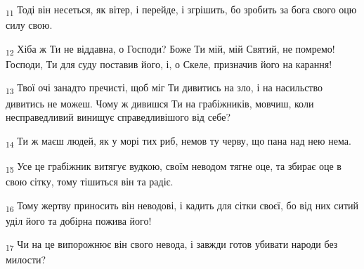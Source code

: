 \begin{tcolorbox}
\textsubscript{11} Тоді він несеться, як вітер, і перейде, і згрішить, бо зробить за бога свого оцю силу свою.
\end{tcolorbox}
\begin{tcolorbox}
\textsubscript{12} Хіба ж Ти не віддавна, о Господи? Боже Ти мій, мій Святий, не помремо! Господи, Ти для суду поставив його, і, о Скеле, призначив його на карання!
\end{tcolorbox}
\begin{tcolorbox}
\textsubscript{13} Твої очі занадто пречисті, щоб міг Ти дивитись на зло, і на насильство дивитись не можеш. Чому ж дивишся Ти на грабіжників, мовчиш, коли несправедливий винищує справедливішого від себе?
\end{tcolorbox}
\begin{tcolorbox}
\textsubscript{14} Ти ж маєш людей, як у морі тих риб, немов ту черву, що пана над нею нема.
\end{tcolorbox}
\begin{tcolorbox}
\textsubscript{15} Усе це грабіжник витягує вудкою, своїм неводом тягне оце, та збирає оце в свою сітку, тому тішиться він та радіє.
\end{tcolorbox}
\begin{tcolorbox}
\textsubscript{16} Тому жертву приносить він неводові, і кадить для сітки своєї, бо від них ситий уділ його та добірна пожива його!
\end{tcolorbox}
\begin{tcolorbox}
\textsubscript{17} Чи на це випорожнює він свого невода, і завжди готов убивати народи без милости?
\end{tcolorbox}
